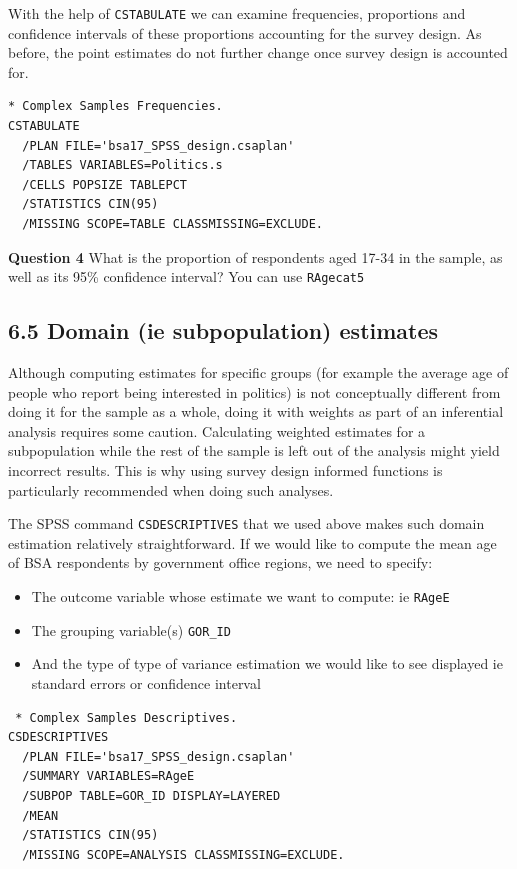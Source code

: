 \documentclass[
  14,
  a4paper,
  DIV=11,
  numbers=noendperiod]{scrartcl}
\providecommand{\tightlist}{%
  \setlength{\itemsep}{0pt}\setlength{\parskip}{0pt}}\usepackage{longtable,booktabs,array}
\begin{document}
With the help of \texttt{CSTABULATE} we can examine frequencies,
proportions and confidence intervals of these proportions accounting for
the survey design. As before, the point estimates do not further change
once survey design is accounted for.

\begin{verbatim}
* Complex Samples Frequencies.
CSTABULATE
  /PLAN FILE='bsa17_SPSS_design.csaplan'
  /TABLES VARIABLES=Politics.s
  /CELLS POPSIZE TABLEPCT
  /STATISTICS CIN(95) 
  /MISSING SCOPE=TABLE CLASSMISSING=EXCLUDE.
\end{verbatim}

\textbf{Question 4} What is the proportion of respondents aged 17-34 in
the sample, as well as its 95\% confidence interval? You can use
\texttt{RAgecat5}

\hypertarget{domain-ie-subpopulation-estimates}{%
\subsection{6.5 Domain (ie subpopulation)
estimates}\label{domain-ie-subpopulation-estimates}}

Although computing estimates for specific groups (for example the
average age of people who report being interested in politics) is not
conceptually different from doing it for the sample as a whole, doing it
with weights as part of an inferential analysis requires some caution.
Calculating weighted estimates for a subpopulation while the rest of the
sample is left out of the analysis might yield incorrect results. This
is why using survey design informed functions is particularly
recommended when doing such analyses.

The SPSS command \texttt{CSDESCRIPTIVES} that we used above makes such
domain estimation relatively straightforward. If we would like to
compute the mean age of BSA respondents by government office regions, we
need to specify:

\begin{itemize}
\tightlist
\item
  The outcome variable whose estimate we want to compute: ie
  \texttt{RAgeE}
\item
  The grouping variable(s) \texttt{GOR\_ID}
\item
  And the type of type of variance estimation we would like to see
  displayed ie standard errors or confidence interval
\end{itemize}

\begin{verbatim}
 * Complex Samples Descriptives.
CSDESCRIPTIVES
  /PLAN FILE='bsa17_SPSS_design.csaplan'
  /SUMMARY VARIABLES=RAgeE
  /SUBPOP TABLE=GOR_ID DISPLAY=LAYERED
  /MEAN
  /STATISTICS CIN(95)
  /MISSING SCOPE=ANALYSIS CLASSMISSING=EXCLUDE.
\end{verbatim}
\end{document}
